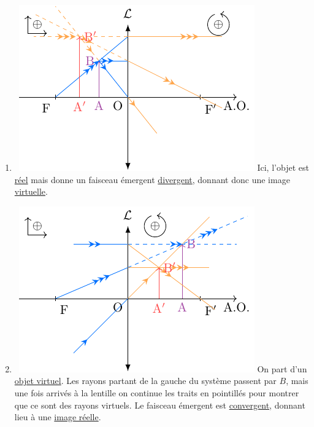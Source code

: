 \documentclass[../../main/main.tex]{subfiles}
\begin{document}
{\begin{multicols}{2}
\begin{enumerate}
			      À partir d'un \underline{objet réel}, on obtient des rayons
			      \underline{parallèles} qui donnent une \underline{image à l'infini}.
			      \columnbreak
			\item ~\smallbreak\includegraphics[width=\linewidth]{convCF}
			      Ici, l'objet est \underline{réel} mais donne un faisceau émergent
			      \underline{divergent}, donnant donc une image \underline{virtuelle}.
			\item ~\smallbreak\includegraphics[width=\linewidth]{convDF}
			      On part d'un \underline{objet virtuel}. Les rayons partant de la
			      gauche du système passent par $B$, mais une fois arrivés à la
			      lentille on continue les traits en pointillés pour montrer que ce
			      sont des rayons virtuels. Le faisceau émergent est
			      \underline{convergent}, donnant lieu à une \underline{image réelle}.

\end{enumerate}
\end{multicols}}
\end{document}

